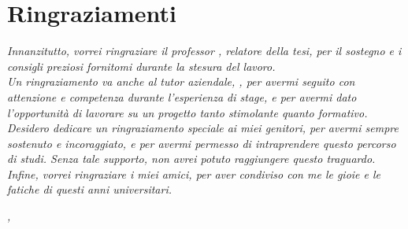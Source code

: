 \chapter*{Ringraziamenti}
\emph{\noindent Innanzitutto, vorrei ringraziare il professor \myProf, relatore della tesi, per il sostegno e i consigli preziosi fornitomi durante la stesura del lavoro.}\\
\emph{Un ringraziamento va anche al tutor aziendale, \myCompanyTutor, per avermi seguito con attenzione e competenza durante l'esperienza di stage, e per avermi dato l'opportunità di lavorare su un progetto tanto stimolante quanto formativo.}\\
\emph{Desidero dedicare un ringraziamento speciale ai miei genitori, per avermi sempre sostenuto e incoraggiato, e per avermi permesso di intraprendere questo percorso di studi. Senza tale supporto, non avrei potuto raggiungere questo traguardo.}\\
\emph{Infine, vorrei ringraziare i miei amici, per aver condiviso con me le gioie e le fatiche di questi anni universitari.}\\
\bigskip


\noindent\textit{\myLocation, \myTime}
\hfill \myName

\endgroup
